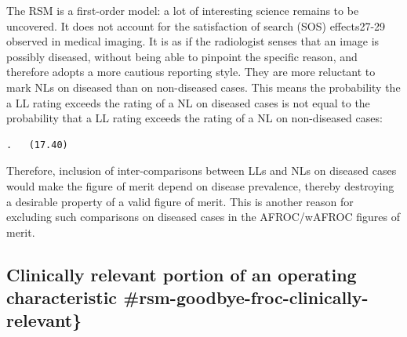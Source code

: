 \documentclass[
]{book}
\begin{document}
The RSM is a first-order model: a lot of interesting science remains to be uncovered. It does not account for the satisfaction of search (SOS) effects27-29 observed in medical imaging. It is as if the radiologist senses that an image is possibly diseased, without being able to pinpoint the specific reason, and therefore adopts a more cautious reporting style. They are more reluctant to mark NLs on diseased than on non-diseased cases. This means the probability the a LL rating exceeds the rating of a NL on diseased cases is not equal to the probability that a LL rating exceeds the rating of a NL on non-diseased cases:

\begin{verbatim}
.   (17.40)
\end{verbatim}

Therefore, inclusion of inter-comparisons between LLs and NLs on diseased cases would make the figure of merit depend on disease prevalence, thereby destroying a desirable property of a valid figure of merit. This is another reason for excluding such comparisons on diseased cases in the AFROC/wAFROC figures of merit.

\hypertarget{clinically-relevant-portion-of-an-operating-characteristic-rsm-goodbye-froc-clinically-relevant}{%
\subsection{Clinically relevant portion of an operating characteristic \#rsm-goodbye-froc-clinically-relevant\}}\label{clinically-relevant-portion-of-an-operating-characteristic-rsm-goodbye-froc-clinically-relevant}}
\end{document}
